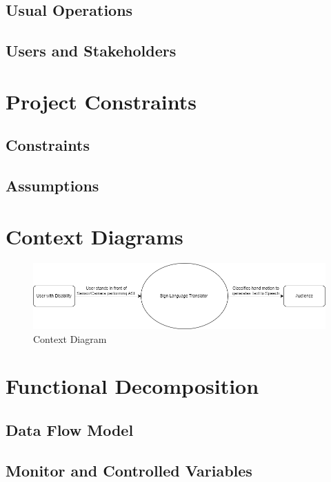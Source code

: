 \documentclass[12pt]{article}
\begin{document}
\subsection{Usual Operations}

\subsection{Users and Stakeholders}

\section{Project Constraints}
\subsection{Constraints}

\subsection{Assumptions}

\section{Context Diagrams}

\begin{figure}[H] 
\centering
\includegraphics[width=1\textwidth]{Context Diagram} 
\caption{Context Diagram} 
\label{Fig.Context_Diagram} 
\end{figure}

\section{Functional Decomposition}
\subsection{Data Flow Model}

\subsection{Monitor and Controlled Variables}
\end{document}
